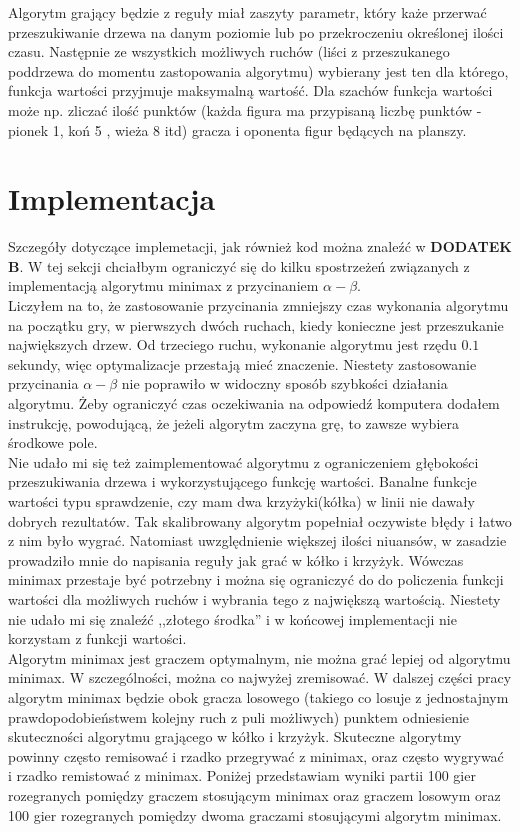 \documentclass[licencjacka]{pracamgr}
\begin{document}
Algorytm grający będzie z reguły miał zaszyty parametr, który każe przerwać przeszukiwanie drzewa na danym poziomie lub po przekroczeniu określonej ilości czasu. Następnie ze wszystkich możliwych ruchów (liści z przeszukanego poddrzewa do momentu zastopowania algorytmu) wybierany jest ten dla którego, funkcja wartości przyjmuje maksymalną wartość. Dla szachów funkcja wartości może np. zliczać ilość punktów (każda figura ma przypisaną liczbę punktów - pionek 1, koń 5 , wieża 8 itd)  gracza i oponenta figur będących na planszy. 


\section{Implementacja}
Szczegóły dotyczące implemetacji, jak również kod można znaleźć w \textbf{DODATEK B}. W tej sekcji chciałbym ograniczyć się do kilku spostrzeżeń związanych z implementacją algorytmu minimax z przycinaniem $\alpha - \beta$.\\

Liczyłem na to, że zastosowanie przycinania zmniejszy czas wykonania algorytmu na początku gry, w pierwszych dwóch ruchach,  kiedy konieczne jest przeszukanie największych drzew. Od trzeciego ruchu, wykonanie algorytmu jest rzędu $0.1$ sekundy, więc optymalizacje przestają mieć znaczenie.  Niestety zastosowanie przycinania $\alpha - \beta$ nie poprawiło w widoczny sposób szybkości działania algorytmu. Żeby ograniczyć czas oczekiwania na odpowiedź komputera dodałem instrukcję, powodującą, że jeżeli algorytm zaczyna grę, to zawsze wybiera środkowe pole.\\

Nie udało mi się też zaimplementować algorytmu z ograniczeniem głębokości przeszukiwania drzewa i wykorzystującego funkcję wartości. Banalne funkcje wartości typu sprawdzenie,  czy mam dwa krzyżyki(kółka) w linii nie dawały dobrych rezultatów. Tak skalibrowany algorytm popełniał oczywiste błędy i łatwo z nim było wygrać.  Natomiast uwzględnienie większej ilości niuansów, w zasadzie prowadziło mnie  do napisania reguły jak grać w kółko i krzyżyk. Wówczas minimax przestaje być potrzebny i można się ograniczyć do do policzenia funkcji wartości dla możliwych ruchów i wybrania tego z największą wartością. Niestety nie udało mi się znaleźć ,,złotego środka'' i w końcowej implementacji nie korzystam z funkcji wartości. \\

Algorytm minimax jest graczem optymalnym, nie można grać lepiej od algorytmu minimax. W szczególności, można co najwyżej zremisować. W dalszej części pracy algorytm minimax będzie obok gracza losowego (takiego co losuje z jednostajnym prawdopodobieństwem kolejny ruch z puli możliwych) punktem odniesienie skuteczności algorytmu grającego w kółko i krzyżyk. Skuteczne algorytmy powinny często remisować i rzadko przegrywać z minimax, oraz często wygrywać i rzadko remistować z minimax. Poniżej przedstawiam wyniki partii 100 gier rozegranych pomiędzy graczem stosującym minimax oraz graczem losowym  oraz 100 gier rozegranych pomiędzy dwoma graczami stosującymi algorytm minimax.\\ 
\end{document}
